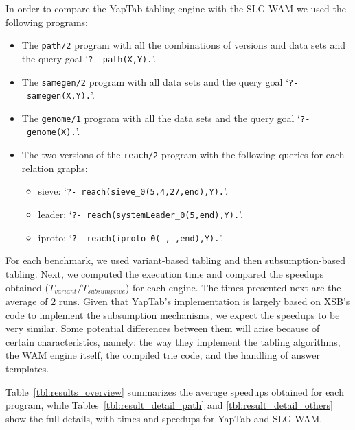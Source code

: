 In order to compare the YapTab tabling engine with the SLG-WAM we used the following programs:

\begin{itemize}
   \item The \texttt{path/2} program with all the combinations of
   versions and data sets and the query goal `\texttt{?-~path(X,Y).}'.
   
   \item The \texttt{samegen/2} program with all data sets and the query goal `\texttt{?-~samegen(X,Y).}'.
   
   \item The \texttt{genome/1} program with all the data sets and the query goal `\texttt{?-~genome(X).}'.
   
   \item The two versions of the \texttt{reach/2} program with the following queries for each relation graphs:

   \begin{itemize}
      \item sieve: `\texttt{?-~reach(sieve\_0(5,4,27,end),Y).}'.
      \item leader: `\texttt{?-~reach(systemLeader\_0(5,end),Y).}'.
      \item iproto: `\texttt{?-~reach(iproto\_0(\_,\_,end),Y).}'.
   \end{itemize}

\end{itemize}

For each benchmark, we used variant-based tabling and then subsumption-based tabling.
Next, we computed the execution time and compared the speedups obtained ($T_{variant} / T_{subsumptive}$) for
each engine. The times presented next are the average of 2 runs. Given that YapTab's implementation
is largely based on XSB's code to implement the subsumption mechanisms,
we expect the speedups to be very similar. Some potential differences between them will arise because
of certain characteristics, namely: the way they implement the tabling algorithms, the WAM engine itself,
the compiled trie code, and the handling of answer templates.

Table~\ref{tbl:results_overview} summarizes the average speedups obtained for each program,
while Tables~\ref{tbl:result_detail_path} and \ref{tbl:result_detail_others}
show the full details, with times and speedups for YapTab and SLG-WAM.

